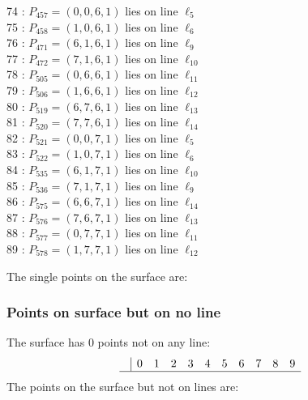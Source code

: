 \documentclass{article}
\begin{document}
{\begin{multicols}{2}
74 : $P_{457}=( 0, 0, 6, 1 )$ lies on line $\ell_{5}$\\
75 : $P_{458}=( 1, 0, 6, 1 )$ lies on line $\ell_{6}$\\
76 : $P_{471}=( 6, 1, 6, 1 )$ lies on line $\ell_{9}$\\
77 : $P_{472}=( 7, 1, 6, 1 )$ lies on line $\ell_{10}$\\
78 : $P_{505}=( 0, 6, 6, 1 )$ lies on line $\ell_{11}$\\
79 : $P_{506}=( 1, 6, 6, 1 )$ lies on line $\ell_{12}$\\
80 : $P_{519}=( 6, 7, 6, 1 )$ lies on line $\ell_{13}$\\
81 : $P_{520}=( 7, 7, 6, 1 )$ lies on line $\ell_{14}$\\
82 : $P_{521}=( 0, 0, 7, 1 )$ lies on line $\ell_{5}$\\
83 : $P_{522}=( 1, 0, 7, 1 )$ lies on line $\ell_{6}$\\
84 : $P_{535}=( 6, 1, 7, 1 )$ lies on line $\ell_{10}$\\
85 : $P_{536}=( 7, 1, 7, 1 )$ lies on line $\ell_{9}$\\
86 : $P_{575}=( 6, 6, 7, 1 )$ lies on line $\ell_{14}$\\
87 : $P_{576}=( 7, 6, 7, 1 )$ lies on line $\ell_{13}$\\
88 : $P_{577}=( 0, 7, 7, 1 )$ lies on line $\ell_{11}$\\
89 : $P_{578}=( 1, 7, 7, 1 )$ lies on line $\ell_{12}$\\
\end{multicols}
The single points on the surface are:\\
\subsubsection*{Points on surface but on no line}
The surface has 0 points not on any line:\\
$$
\begin{array}{r|*{10}{r}}
 & 0 & 1 & 2 & 3 & 4 & 5 & 6 & 7 & 8 & 9\\
\hline
\end{array}
$$
The points on the surface but not on lines are:\\
\begin{multicols}{2}
\noindent
\end{multicols}
}
\end{document}
